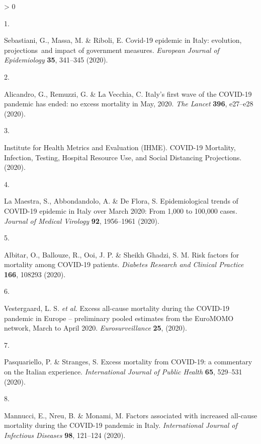 \documentclass[
]{article}
\newlength{\cslhangindent}
\newlength{\csllabelwidth}
\newenvironment{CSLReferences}[2] %
 {%
  \setlength{\parindent}{0pt}
  \ifodd #1 \everypar{\setlength{\hangindent}{\cslhangindent}}\ignorespaces\fi
  \ifnum #2 > 0
  \setlength{\parskip}{#2\baselineskip}
  \fi
 }%
 {}
\newcommand{\CSLLeftMargin}[1]{\parbox[t]{\csllabelwidth}{#1}}
\newcommand{\CSLRightInline}[1]{\parbox[t]{\linewidth - \csllabelwidth}{#1}\break}
\begin{document}
\hypertarget{refs}{}
\begin{CSLReferences}{0}{0}
\leavevmode\hypertarget{ref-Sebastiani2020}{}%
\CSLLeftMargin{1. }
\CSLRightInline{Sebastiani, G., Massa, M. \& Riboli, E. {Covid-19 epidemic in Italy: evolution, projections~and impact of government measures}. \emph{European Journal of Epidemiology} \textbf{35}, 341--345 (2020).}

\leavevmode\hypertarget{ref-Alicandro2020}{}%
\CSLLeftMargin{2. }
\CSLRightInline{Alicandro, G., Remuzzi, G. \& La Vecchia, C. {Italy's first wave of the COVID-19 pandemic has ended: no excess mortality in May, 2020}. \emph{The Lancet} \textbf{396}, e27--e28 (2020).}

\leavevmode\hypertarget{ref-InstituteforHealthMetricsandEvaluationIHME2020}{}%
\CSLLeftMargin{3. }
\CSLRightInline{Institute for Health Metrics and Evaluation (IHME). {COVID-19 Mortality, Infection, Testing, Hospital Resource Use, and Social Distancing Projections}. (2020).}

\leavevmode\hypertarget{ref-LaMaestra2020}{}%
\CSLLeftMargin{4. }
\CSLRightInline{La Maestra, S., Abbondandolo, A. \& De Flora, S. {Epidemiological trends of COVID-19 epidemic in Italy over March 2020: From 1,000 to 100,000 cases}. \emph{Journal of Medical Virology} \textbf{92}, 1956--1961 (2020).}

\leavevmode\hypertarget{ref-Albitar2020}{}%
\CSLLeftMargin{5. }
\CSLRightInline{Albitar, O., Ballouze, R., Ooi, J. P. \& Sheikh Ghadzi, S. M. {Risk factors for mortality among COVID-19 patients}. \emph{Diabetes Research and Clinical Practice} \textbf{166}, 108293 (2020).}

\leavevmode\hypertarget{ref-Vestergaard2020}{}%
\CSLLeftMargin{6. }
\CSLRightInline{Vestergaard, L. S. \emph{et al.} {Excess all-cause mortality during the COVID-19 pandemic in Europe -- preliminary pooled estimates from the EuroMOMO network, March to April 2020}. \emph{Eurosurveillance} \textbf{25}, (2020).}

\leavevmode\hypertarget{ref-Pasquariello2020}{}%
\CSLLeftMargin{7. }
\CSLRightInline{Pasquariello, P. \& Stranges, S. {Excess mortality from COVID-19: a commentary on the Italian experience}. \emph{International Journal of Public Health} \textbf{65}, 529--531 (2020).}

\leavevmode\hypertarget{ref-Mannucci2020}{}%
\CSLLeftMargin{8. }
\CSLRightInline{Mannucci, E., Nreu, B. \& Monami, M. {Factors associated with increased all-cause mortality during the COVID-19 pandemic in Italy}. \emph{International Journal of Infectious Diseases} \textbf{98}, 121--124 (2020).}


\end{CSLReferences}
\end{document}
